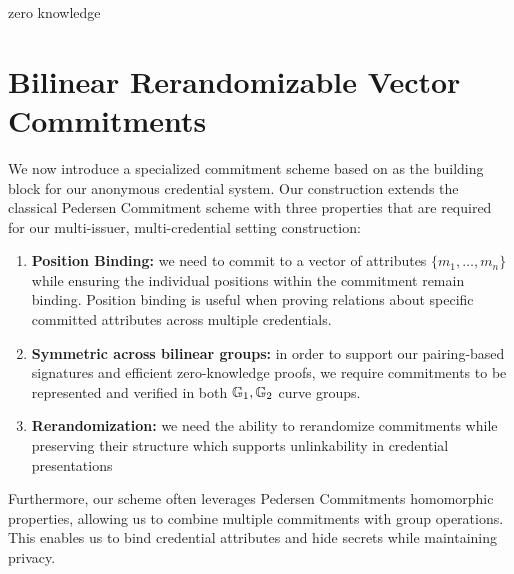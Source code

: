 \begin{definition}
    zero knowledge
\end{definition}


% 
% 


























% 
% 


\newpage
\section{Bilinear Rerandomizable Vector Commitments}
We now introduce a specialized commitment scheme based on \cite{tomescu2022utt} as the building block for our anonymous credential system. Our construction extends the classical Pedersen Commitment scheme with three properties that are required for our multi-issuer, multi-credential setting construction:
\begin{enumerate}
    \item \textbf{Position Binding: } we need to commit to a vector of attributes $\{m_1, \ldots, m_n\}$ while ensuring the individual positions within the commitment remain binding. Position binding is useful when proving relations about specific committed attributes across multiple credentials. 
    
    \item \textbf{Symmetric across bilinear groups: } in order to support our pairing-based signatures and efficient zero-knowledge proofs, we require commitments to be represented and verified in both $\mathbb{G}_1, \mathbb{G}_2$ curve groups. 
    
    \item \textbf{Rerandomization: } we need the ability to rerandomize commitments while preserving their structure which supports unlinkability in credential presentations
\end{enumerate}

\noindent Furthermore, our scheme often leverages Pedersen Commitments homomorphic properties, allowing us to combine multiple commitments with group operations. This enables us to bind credential attributes and hide secrets while maintaining privacy. 



